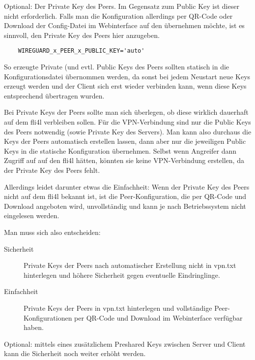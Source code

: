 \begin{description}
Optional: Der Private Key des Peers. Im Gegensatz zum Public Key ist dieser nicht erforderlich. Falls man
die Konfiguration allerdings per QR-Code oder Download der Config-Datei im Webinterface auf den übernehmen möchte,
ist es sinnvoll, den Private Key des Peers hier anzugeben.

\begin{example}
\begin{verbatim}
    WIREGUARD_x_PEER_x_PUBLIC_KEY='auto'
\end{verbatim}
\end{example}

So erzeugte Private (und evtl. Public Keys des Peers sollten statisch in die Konfigurationsdatei übernommen werden, da
sonst bei jedem Neustart neue Keys erzeugt werden und der Client sich erst wieder verbinden kann, wenn diese
Keys entsprechend übertragen wurden.

Bei Private Keys der Peers sollte man sich überlegen, ob diese wirklich dauerhaft auf dem fli4l verbleiben sollen.
Für die VPN-Verbindung sind nur die Public Keys des Peers notwendig (sowie Private Key des Servers). Man kann 
also durchaus die Keys der Peers automatisch erstellen lassen, dann aber nur die jeweiligen Public Keys in die 
statische Konfiguration übernehmen. Selbst wenn Angreifer dann Zugriff auf auf den fli4l hätten, könnten sie 
keine VPN-Verbindung erstellen, da der Private Key des Peers fehlt.

Allerdings leidet darunter etwas die Einfachheit: Wenn der Private Key des Peers nicht auf dem fli4l bekannt ist,
ist die Peer-Konfiguration, die per QR-Code und Download angeboten wird, unvollständig und kann je nach 
Betriebssystem nicht eingelesen werden.

Man muss sich also entscheiden:

\begin{description}
    \item[Sicherheit] Private Keys der Peers nach automatischer Erstellung nicht in vpn.txt hinterlegen und höhere
    Sicherheit gegen eventuelle Eindringlinge.
    \item[Einfachheit] Private Keys der Peers in vpn.txt hinterlegen und vollständige Peer-Kon\-fi\-gu\-ra\-tio\-nen per 
    QR-Code und Download im Webinterface verfügbar haben.
\end{description}



Optional: mittels eines zusätzlichem Preshared Keys zwischen Server
und Client kann die Sicherheit noch weiter erhöht werden.


\end{description}
